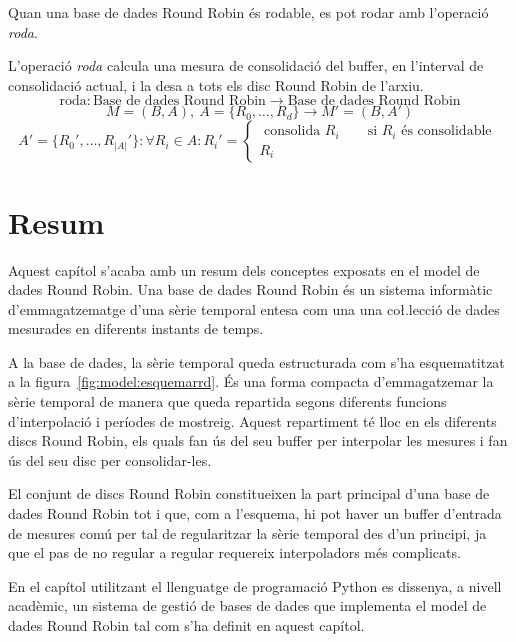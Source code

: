 {Quan una base de dades Round Robin és rodable, es pot rodar amb l'operació \emph{roda}. 
 
\begin{definition}
  L'operació \emph{roda} calcula una mesura de consolidació del
  buffer, en l'interval de consolidació actual, i la desa a tots els
  disc Round Robin de l'arxiu.
  \[
  \text{roda}: \text{Base de dades Round Robin} \longrightarrow
  \text{Base de dades Round Robin}
  \]
  \[
  M=(B,A),\ A = \{R_0,\ldots,R_d\} \longrightarrow M'= (B,A')
  \]
  \[
  A'= \{R_0',\ldots,R_{|A|}'\}: \forall R_i \in A: R_i' =
  \left\{ \begin{array}{l}
      \text{ consolida } R_i \qquad \text{si } R_i \text{ és consolidable }\\
      R_i
    \end{array} \right.
  \]
\end{definition}


\section{Resum}

Aquest capítol s'acaba amb un resum dels conceptes exposats en el model de dades Round Robin. Una base de dades Round Robin és un sistema informàtic d'emmagatzematge d'una sèrie temporal entesa com una  una co\l.lecció de dades mesurades en diferents instants de temps.

A la base de dades, la sèrie temporal queda estructurada com s'ha esquematitzat a  la figura~\ref{fig:model:esquemarrd}. És una forma compacta d'emmagatzemar la sèrie temporal de manera que queda repartida segons diferents funcions d'interpolació i períodes de mostreig. Aquest repartiment té lloc en els diferents discs Round Robin, els quals fan ús del seu buffer per interpolar les mesures i fan ús del seu disc per consolidar-les. 

El conjunt de discs Round Robin constitueixen la part principal d'una base de dades Round Robin tot i que, com a l'esquema, hi pot haver un buffer d'entrada de mesures comú per tal de regularitzar la sèrie temporal des d'un principi, ja que el pas de no regular a regular requereix interpoladors més complicats.


En el capítol%
 utilitzant el llenguatge de programació Python es dissenya, a nivell acadèmic, un sistema de gestió de bases de dades que implementa el model de dades Round Robin tal com s'ha definit en aquest capítol.


}
